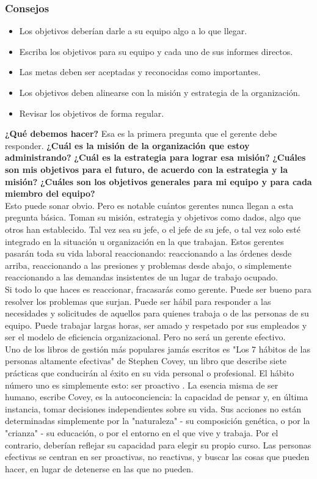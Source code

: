 \documentclass[10pt]{book}
\begin{document}
\subsubsection{Consejos}
\begin{itemize}
\item Los objetivos deberían darle a su equipo algo a lo que llegar.
\item Escriba los objetivos para su equipo y cada uno de sus informes directos.
\item Las metas deben ser aceptadas y reconocidas como importantes.
\item Los objetivos deben alinearse con la misión y estrategia de la organización.
\item Revisar los objetivos de forma regular.
\end{itemize}
\textbf{¿Qué debemos hacer?} Esa es la primera pregunta que el gerente debe responder. \textbf{¿Cuál es la misión de la organización que estoy administrando?} \textbf{¿Cuál es la estrategia para lograr esa misión?} \textbf{¿Cuáles son mis objetivos para el futuro, de acuerdo con la estrategia y la misión?} \textbf{¿Cuáles son los objetivos generales para mi equipo y para cada miembro del equipo?}\\
Esto puede sonar obvio. Pero es notable cuántos gerentes nunca llegan a esta pregunta básica. Toman su misión, estrategia y objetivos como dados, algo que otros han establecido. Tal vez sea su jefe, o el jefe de su jefe, o tal vez solo esté integrado en la situación u organización en la que trabajan. Estos gerentes pasarán toda su vida laboral reaccionando: reaccionando a las órdenes desde arriba, reaccionando a las presiones y problemas desde abajo, o simplemente reaccionando a las demandas insistentes de un lugar de trabajo ocupado.\\
Si todo lo que haces es reaccionar, fracasarás como gerente. Puede ser bueno para resolver los problemas que surjan. Puede ser hábil para responder a las necesidades y solicitudes de aquellos para quienes trabaja o de las personas de su equipo. Puede trabajar largas horas, ser amado y respetado por sus empleados y ser el modelo de eficiencia organizacional. Pero no será un gerente efectivo.\\
Uno de los libros de gestión más populares jamás escritos es "Los 7 hábitos de las personas altamente efectivas" de Stephen Covey, un libro que describe siete prácticas que conducirán al éxito en su vida personal o profesional. El hábito número uno es simplemente esto: ser proactivo . La esencia misma de ser humano, escribe Covey, es la autoconciencia: la capacidad de pensar y, en última instancia, tomar decisiones independientes sobre su vida. Sus acciones no están determinadas simplemente por la "naturaleza" - su composición genética, o por la "crianza" - su educación, o por el entorno en el que vive y trabaja. Por el contrario, deberían reflejar su capacidad para elegir su propio curso. Las personas efectivas se centran en ser proactivas, no reactivas, y buscar las cosas que pueden hacer, en lugar de detenerse en las que no pueden.\\
\end{document}
